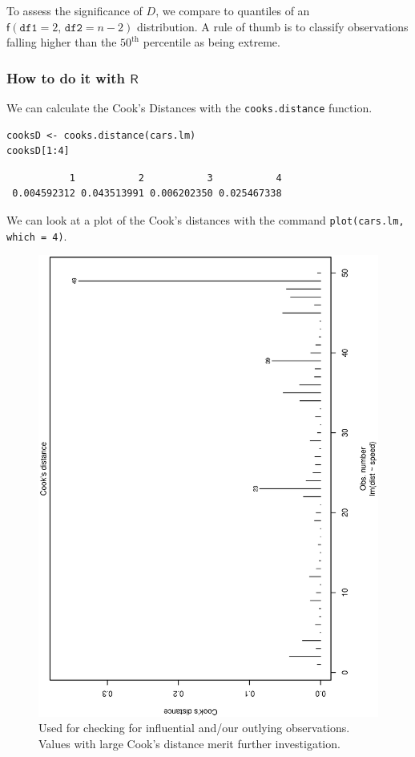 \documentclass[captions=tableheading]{scrbook}
\begin{document}
To assess the significance of \(D\), we compare to quantiles of an \(\mathsf{f}(\mathtt{df1}=2,\,\mathtt{df2}=n-2)\) distribution. A rule of thumb is to classify observations falling higher than the \(50^{\mathrm{th}}\) percentile as being extreme. 
\subsubsection{How to do it with \(\mathsf{R}\)}
\label{sec-11-5-4-3}


We can calculate the Cook's Distances with the \texttt{cooks.distance} function.


\lstset{language=R}
\begin{lstlisting}
cooksD <- cooks.distance(cars.lm)
cooksD[1:4]
\end{lstlisting}

\begin{verbatim}
           1           2           3           4 
 0.004592312 0.043513991 0.006202350 0.025467338
\end{verbatim}

We can look at a plot of the Cook's distances with the command \texttt{plot(cars.lm, which = 4)}.

\begin{figure}[th]
  \includegraphics[angle=270, totalheight=4in]{ps/slr/Cooks-distance-cars.ps}
  \caption[Cook's distances for the \texttt{cars} data]{\small Used for checking for influential and/our outlying observations. Values with large Cook's distance merit further investigation.}
  \label{fig-Cooks-distance-cars}
\end{figure}
\end{document}
